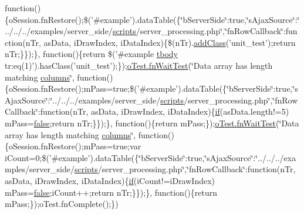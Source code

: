 \begin{DoxyCompactItemize}
function()\{o\+Session.\+fn\+Restore();\$('\#example').data\+Table(\{\char`\"{}b\+Server\+Side\char`\"{}\+:true,\char`\"{}s\+Ajax\+Source\char`\"{}\+:\char`\"{}../../../examples/server\+\_\+side/\hyperlink{tinymce_8jquery_8dev_8js_a09066d4d580eeec222f858d588b4cdef}{scripts}/server\+\_\+processing.\+php\char`\"{},\char`\"{}fn\+Row\+Callback\char`\"{}\+:function(n\+Tr, as\+Data, i\+Draw\+Index, i\+Data\+Index)\{\$(n\+Tr).\hyperlink{validate_8js_aa1bdc289a4a564fbb2274cf7ab39c021}{add\+Class}('unit\+\_\+test');return n\+Tr;\}\});\}, function()\{return \$('\#example \hyperlink{core_8constructor_8js_a99b0542c7c50fe8757c55bf9dac5f3be}{tbody} tr\+:eq(1)').has\+Class('unit\+\_\+test');\});\hyperlink{onhold_24__server-side_2__zero__config_8js_ab25c4d596771c0133cdc45178ce72c3d}{o\+Test.\+fn\+Wait\+Test}(\char`\"{}Data array has length matching \hyperlink{model_8defaults_8columns_8js_af310571d7a4fac04bd949bdefb852a47}{columns}\char`\"{}, function()\{o\+Session.\+fn\+Restore();m\+Pass=true;\$('\#example').data\+Table(\{\char`\"{}b\+Server\+Side\char`\"{}\+:true,\char`\"{}s\+Ajax\+Source\char`\"{}\+:\char`\"{}../../../examples/server\+\_\+side/\hyperlink{tinymce_8jquery_8dev_8js_a09066d4d580eeec222f858d588b4cdef}{scripts}/server\+\_\+processing.\+php\char`\"{},\char`\"{}fn\+Row\+Callback\char`\"{}\+:function(n\+Tr, as\+Data, i\+Draw\+Index, i\+Data\+Index)\{\hyperlink{fullpage_2plugin_8js_a8b98017e64ef036adb9ae327ff94abe1}{if}(as\+Data.\+length!=5) m\+Pass=\hyperlink{validate_8js_a5df37b7f02e5cdc7d9412b7f872b8e01}{false};return n\+Tr;\}\});\}, function()\{return m\+Pass;\});\hyperlink{onhold_24__server-side_2__zero__config_8js_ab25c4d596771c0133cdc45178ce72c3d}{o\+Test.\+fn\+Wait\+Test}(\char`\"{}Data array has length matching \hyperlink{model_8defaults_8columns_8js_af310571d7a4fac04bd949bdefb852a47}{columns}\char`\"{}, function()\{o\+Session.\+fn\+Restore();m\+Pass=true;var i\+Count=0;\$('\#example').data\+Table(\{\char`\"{}b\+Server\+Side\char`\"{}\+:true,\char`\"{}s\+Ajax\+Source\char`\"{}\+:\char`\"{}../../../examples/server\+\_\+side/\hyperlink{tinymce_8jquery_8dev_8js_a09066d4d580eeec222f858d588b4cdef}{scripts}/server\+\_\+processing.\+php\char`\"{},\char`\"{}fn\+Row\+Callback\char`\"{}\+:function(n\+Tr, as\+Data, i\+Draw\+Index, i\+Data\+Index)\{\hyperlink{fullpage_2plugin_8js_a8b98017e64ef036adb9ae327ff94abe1}{if}(i\+Count!=i\+Draw\+Index) m\+Pass=\hyperlink{validate_8js_a5df37b7f02e5cdc7d9412b7f872b8e01}{false};i\+Count++;return n\+Tr;\}\});\}, function()\{return m\+Pass;\});o\+Test.\+fn\+Complete();\})
\end{DoxyCompactItemize}


